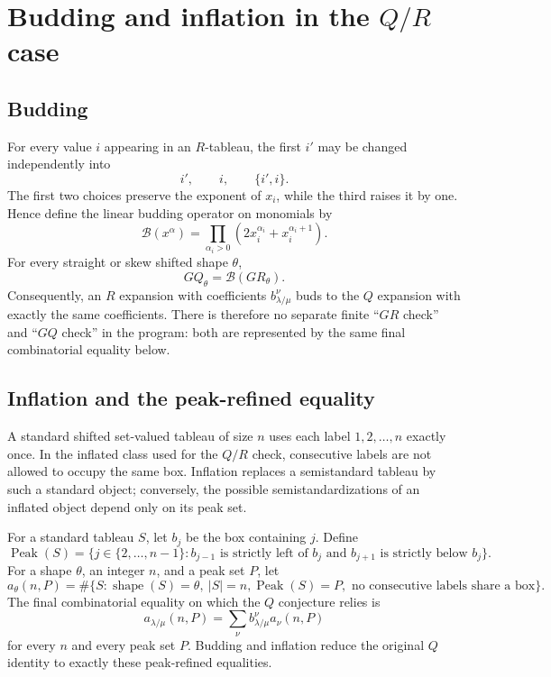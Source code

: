 \documentclass[11pt]{article}
\theoremstyle{definition}
\theoremstyle{remark}
\newcommand{\Peak}{\operatorname{Peak}}
\newcommand{\cB}{\mathcal{B}}
\begin{document}
\section{Budding and inflation in the $Q/R$ case}
\label{sec:budding-inflation}

\subsection{Budding}

For every value $i$ appearing in an $R$-tableau, the first $i'$ may be changed
independently into
\[
  i',\qquad i,\qquad \{i',i\}.
\]
The first two choices preserve the exponent of $x_i$, while the third raises
it by one.  Hence define the linear budding operator on monomials by
\[
  \cB(x^\alpha)
  =\prod_{\alpha_i>0}\left(2x_i^{\alpha_i}+x_i^{\alpha_i+1}\right).
\]
For every straight or skew shifted shape $\theta$,
\[
  GQ_\theta=\cB(GR_\theta).
\]
Consequently, an $R$ expansion with coefficients
$b_{\lambda/\mu}^{\nu}$ buds to the $Q$ expansion with exactly the same
coefficients.  There is therefore no separate finite ``$GR$ check'' and
``$GQ$ check'' in the program: both are represented by the same final
combinatorial equality below.

\subsection{Inflation and the peak-refined equality}

A standard shifted set-valued tableau of size $n$ uses each label
$1,2,\ldots,n$ exactly once.  In the inflated class used for the $Q/R$ check,
consecutive labels are not allowed to occupy the same box.  Inflation replaces
a semistandard tableau by such a standard object; conversely, the possible
semistandardizations of an inflated object depend only on its peak set.

For a standard tableau $S$, let $b_j$ be the box containing $j$.  Define
\[
  \Peak(S)=\{j\in\{2,\ldots,n-1\}:
  b_{j-1}\text{ is strictly left of }b_j
  \text{ and }b_{j+1}\text{ is strictly below }b_j\}.
\]
For a shape $\theta$, an integer $n$, and a peak set $P$, let
\[
  a_\theta(n,P)
  =\#\{S:\operatorname{shape}(S)=\theta,\ |S|=n,
           \Peak(S)=P,
           \text{ no consecutive labels share a box}\}.
\]
The final combinatorial equality on which the $Q$ conjecture relies is
\begin{equation}
\label{eq:qr-final}
  a_{\lambda/\mu}(n,P)
  =\sum_\nu b_{\lambda/\mu}^{\nu}a_\nu(n,P)
\end{equation}
for every $n$ and every peak set $P$.  Budding and inflation reduce the
original $Q$ identity to exactly these peak-refined equalities.
\end{document}
